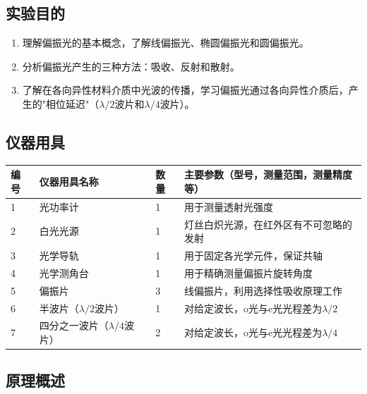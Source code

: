 \documentclass[dvipsnames, svgnames,a4paper,11pt]{article}
\begin{document}
\setcounter{section}{0}
	
\subsection{实验目的}
\begin{enumerate}
	\item 理解偏振光的基本概念，了解线偏振光、椭圆偏振光和圆偏振光。
	\item 分析偏振光产生的三种方法：吸收、反射和散射。
	\item 了解在各向异性材料介质中光波的传播，学习偏振光通过各向异性介质后，产生的"相位延迟"（$\lambda/2$波片和$\lambda/4$波片）。
\end{enumerate}

\subsection{仪器用具}
\begin{table}[htbp]
	\centering
	\renewcommand\arraystretch{1.6}
	\begin{tabular}{p{}|p{}|p{}|p{}}
	\hline
	编号& 仪器用具名称 & 数量 &  主要参数（型号，测量范围，测量精度等） \\
	\hline
	1&光功率计 &1 & 用于测量透射光强度 \\

	2&白光光源 &1 & 灯丝白炽光源，在红外区有不可忽略的发射 \\
	
	3&光学导轨 & 1 & 用于固定各光学元件，保证共轴 \\
	
	4&光学测角台&1 & 用于精确测量偏振片旋转角度 \\
	5&偏振片&3 & 线偏振片，利用选择性吸收原理工作 \\
	6&半波片（$\lambda/2$波片）&1 & 对给定波长，o光与e光光程差为$\lambda/2$ \\
	7&四分之一波片（$\lambda/4$波片）&2 & 对给定波长，o光与e光光程差为$\lambda/4$ \\
	
	\hline
\end{tabular}
\end{table}

\subsection{原理概述}
\end{document}
